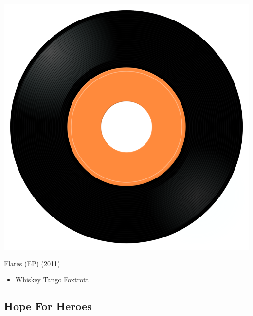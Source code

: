 \begin{minipage}[t]{0.25\textwidth}
\captionsetup{type=figure}
\includegraphics[width=\textwidth]{Images/cover.png}
\caption*{Flares (EP) (2011)}
\end{minipage}
\begin{minipage}[t]{0.25\textwidth}\vspace{0pt}
\begin{itemize}[nosep,leftmargin=1em,labelwidth=*,align=left]
	\setlength{\itemsep}{0pt}
	\item Whiskey Tango Foxtrott
\end{itemize}
\end{minipage}

\subsection{Hope For Heroes}

